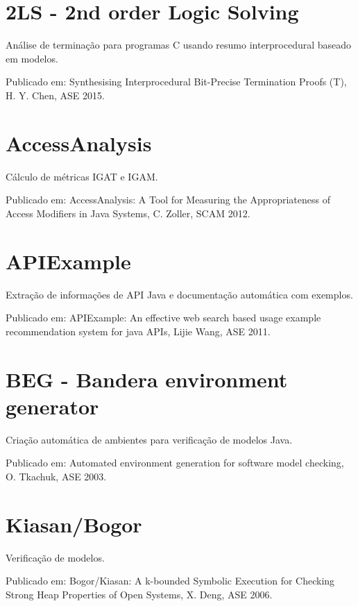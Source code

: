 

\label{softwares-summary}

\section{2LS - 2nd order Logic Solving}

Análise de terminação para programas C usando resumo interprocedural baseado em modelos.

Publicado em: Synthesising Interprocedural Bit-Precise Termination Proofs (T),
H. Y. Chen,
ASE
2015.

\section{AccessAnalysis}

Cálculo de métricas IGAT e IGAM.

Publicado em: AccessAnalysis: A Tool for Measuring the Appropriateness of Access Modifiers in Java Systems,
C. Zoller,
SCAM
2012.

\section{APIExample}

Extração de informações de API Java e documentação automática com exemplos.

Publicado em: APIExample: An effective web search based usage example recommendation system for java APIs,
Lijie Wang,
ASE
2011.

\section{BEG - Bandera environment generator}

Criação automática de ambientes para verificação de modelos Java.

Publicado em: Automated environment generation for software model checking,
O. Tkachuk,
ASE
2003.

\section{Kiasan/Bogor}

Verificação de modelos.

Publicado em: Bogor/Kiasan: A k-bounded Symbolic Execution for Checking Strong Heap Properties of Open Systems,
X. Deng,
ASE
2006.


